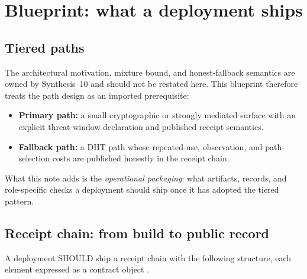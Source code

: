 \documentclass[11pt]{article}
\begin{document}
\section{Blueprint: what a deployment ships}

\subsection{Tiered paths}
The architectural motivation, mixture bound, and honest-fallback semantics are owned by Synthesis~10 and should not be restated here.\cite{series:tieredpattern}
This blueprint therefore treats the path design as an imported prerequisite:
\begin{itemize}[leftmargin=*]
\item \textbf{Primary path:} a small cryptographic or strongly mediated surface with an explicit threat-window declaration and published receipt semantics.
\item \textbf{Fallback path:} a DHT path whose repeated-use, observation, and path-selection costs are published honestly in the receipt chain.
\end{itemize}
What this note adds is the \emph{operational packaging}: what artifacts, records, and role-specific checks a deployment should ship once it has adopted the tiered pattern.

\subsection{Receipt chain: from build to public record}

A deployment SHOULD ship a receipt chain with the following structure, each element expressed as a contract object \cite{series:contractobjects}.
\end{document}
